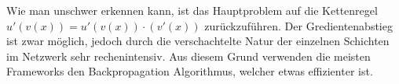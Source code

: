 Wie man unschwer erkennen kann, ist das Hauptproblem auf die Kettenregel $u'(v(x)) = u'(v(x)) \cdot (v'(x))$ zurückzuführen. Der Gredientenabstieg ist zwar möglich, jedoch durch die verschachtelte Natur der einzelnen Schichten im Netzwerk sehr rechenintensiv. Aus diesem Grund verwenden die meisten Frameworks den Backpropagation Algorithmus, welcher etwas effizienter ist.
